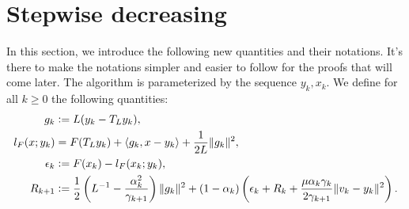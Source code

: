 \documentclass[12pt]{article}
\begin{document}
\section{Stepwise decreasing}
    In this section, we introduce the following new quantities and their notations. 
    It's there to make the notations simpler and easier to follow for the proofs that will come later. 
    The algorithm is parameterized by the sequence $y_k, x_k$. 
    We define for all $k \ge 0$ the following quantities: 
    \begin{align}
        g_k &\vcentcolon= L(y_k - T_L y_k), 
        \label{eqn:grad-map}
        \\
        l_F(x; y_k) &= F(T_Ly_k) + \langle g_k, x - y_k\rangle + \frac{1}{2L}\Vert g_k\Vert^2, 
        \label{eqn:lower-linearization}
        \\
        \epsilon_{k} &\vcentcolon= F(x_k) - l_F(x_k; y_k), 
        \label{eqn:regret}
        \\
        R_{k + 1}
        &\vcentcolon= 
        \frac{1}{2}\left(
            L^{-1} - \frac{\alpha_k^2}{\gamma_{k + 1}}
        \right)\Vert g_k\Vert^2
        + 
        (1 - \alpha_k)
        \left(
            \epsilon_k + R_k + 
            \frac{\mu\alpha_k\gamma_k}{2\gamma_{k + 1}}
            \Vert v_k - y_k\Vert^2
        \right). 
        \label{eqn:residual}
    \end{align}
\end{document}
